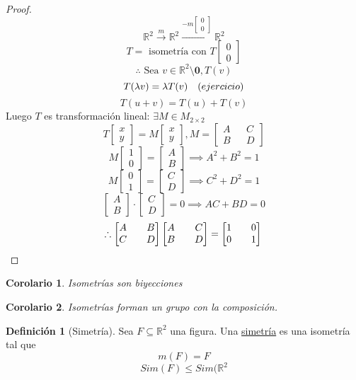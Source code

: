 \documentclass[11pt]{book}
\renewcommand{\vec}[1]{\mathbf{#1}}
\newtheorem*{cor}{Corolario}
\theoremstyle{definition}
\newtheorem{defn}{Definición}[section]
\begin{document}
\begin{proof}
\[\mathbb{R}^2\xrightarrow{m}\mathbb{R}^2\xrightarrow{-m\begin{bmatrix} 0\\ 0\end{bmatrix}}\mathbb{R}^2\]
\[T=\textrm{ isometría con }T\begin{bmatrix} 0 \\ 0\end{bmatrix}\]
\[\therefore \textrm{ Sea }v\in \mathbb{R}^2\setminus\vec{0}, T(v)\]
\[T(\lambda v)=\lambda T(v)\quad\textrm(ejercicio)\]
\[T(u+v)=T(u)+T(v)\]
Luego $T$ es transformación lineal: $\exists M\in M_{2\times 2}$
\[ T\begin{bmatrix} x\\ y\end{bmatrix}=M\begin{bmatrix} x\\ y\end{bmatrix}, M=\begin{bmatrix} A && C\\ B && D\end{bmatrix}\]
\[ M\begin{bmatrix} 1\\ 0\end{bmatrix}=\begin{bmatrix} A\\ B\end{bmatrix}\implies A^2+B^2=1\]
\[ M\begin{bmatrix} 0\\ 1\end{bmatrix}=\begin{bmatrix} C\\ D\end{bmatrix}\implies C^2+D^2=1\]
\[\begin{bmatrix} A\\ B\end{bmatrix}\cdot\begin{bmatrix} C\\ D\end{bmatrix}=0\implies AC+BD=0\]
\[\therefore \begin{bmatrix} A && B\\ C && D\end{bmatrix}\begin{bmatrix} A && C\\ B && D\end{bmatrix}=\begin{bmatrix} 1 && 0\\ 0 && 1\end{bmatrix}\qedhere\]
\end{proof}
\begin{cor}
Isometrías son biyecciones
\end{cor}
\begin{cor}
Isometrías forman un grupo con la composición.
\end{cor}
\begin{defn}[Simetría]
Sea $F\subseteq\mathbb{R}^2$ una figura. Una \underline{simetría} es una isometría tal que
\[m(F)=F\]
\[Sim(F)\leq Sim(\mathbb{R}^2\]
\end{defn}
\end{document}
